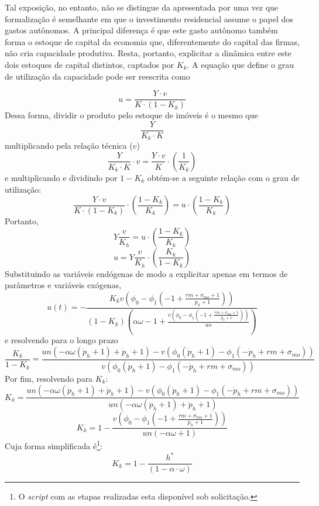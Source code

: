 
Tal exposição, no entanto, não se distingue da apresentada por \textcite{freitas_growth_2015} uma vez que formalização é semelhante em que o investimento residencial assume o papel dos gastos autônomos. A principal diferença é que este gasto autônomo também forma o estoque de capital da economia que, diferentemente do capital das firmas, não cria capacidade produtiva. Resta, portanto, explicitar a dinâmica entre este dois estoques de capital distintos, captados por $K_k$. A equação que define o grau de utilização da capacidade pode ser reescrita como

$$
u = \frac{Y\cdot v}{K \cdot (1-K_k)}
$$
Dessa forma, dividir o produto pelo estoque de imóveis é o mesmo que
$$
\frac{Y}{K_k\cdot K}
$$
multiplicando pela relação técnica ($v$)
$$
\frac{Y}{K_k\cdot K}\cdot v = \frac{Y\cdot v}{K}\cdot \left(\frac{1}{K_k}\right)
$$
e multiplicando e dividindo por $1-K_k$ obtém-se a seguinte relação com o grau de utilização:
$$
\frac{Y\cdot v}{K\cdot (1-K_k)}\cdot \left(\frac{1-K_k}{K_k}\right) = u \cdot \left(\frac{1-K_k}{K_k}\right)
$$
Portanto,
$$
Y\frac{v}{K_h} =  u \cdot \left(\frac{1-K_k}{K_k}\right)
$$
$$
u = Y\frac{v}{K_h} \cdot \left(\frac{K_k}{1-K_k}\right)
$$
Substituindo as variáveis endógenas de modo a explicitar apenas em termos de parâmetros e variáveis exógenas,
$$
u{\left(t \right)} = - \frac{K_{k} v \left(\phi_{0} - \phi_{1} \left(-1 + \frac{rm + \sigma_{mo} + 1}{\dot p_h + 1}\right)\right)}{\left(1 - K_{k}\right) \left(\alpha \omega - 1 + \frac{v \left(\phi_{0} - \phi_{1} \left(-1 + \frac{rm + \sigma_{mo} + 1}{\dot p_h + 1}\right)\right)}{un}\right)}
$$
e resolvendo para o longo prazo
$$
\frac{K_{k}}{1 - K_{k}} = \frac{un \left(- \alpha \omega \left(\dot p_h + 1\right) + \dot p_h + 1\right) - v \left(\phi_{0} \left(\dot p_h + 1\right) - \phi_{1} \left(- \dot p_h + rm + \sigma_{mo}\right)\right)}{v \left(\phi_{0} \left(\dot p_h + 1\right) - \phi_{1} \left(- \dot p_h + rm + \sigma_{mo}\right)\right)}
$$
Por fim, resolvendo para $K_k$:
$$
K_{k} = \frac{un \left(- \alpha \omega \left(\dot p_h + 1\right) + \dot p_h + 1\right) - v \left(\phi_{0} \left(\dot p_h + 1\right) - \phi_{1} \left(- \dot p_h + rm + \sigma_{mo}\right)\right)}{un \left(- \alpha \omega \left(\dot p_h + 1\right) + \dot p_h + 1\right)}
$$
\begin{equation}
\label{kAnali}
K_{k} = 1 - \frac{v \left(\phi_{0} - \phi_{1} \left(-1 + \frac{rm + \sigma_{mo} + 1}{\dot p_h + 1}\right)\right)}{un \left(- \alpha \omega + 1\right)}
\end{equation}
Cuja forma simplificada é\footnote{O \textit{script} com as etapas realizadas esta disponível sob solicitação.}:
$$
K_k = 1 - \frac{h^*}{(1 - \alpha\cdot\omega)}
$$

